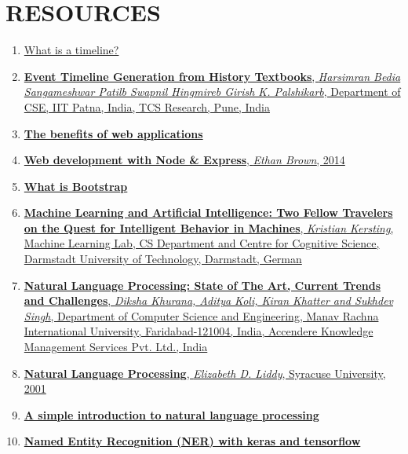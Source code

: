 \documentclass{report}
\begin{document}
\section* {RESOURCES}
\begin{enumerate}
\item \href{http://literacy.kent.edu/eureka/strategies/WhatisaTimeline.pdf}{What is a timeline?}
\item \href{https://aclweb.org/anthology/W17-5912}{\textbf{Event Timeline Generation from History Textbooks}, \textit{Harsimran Bedia Sangameshwar Patilb Swapnil Hingmireb Girish K. Palshikarb}, Department of CSE, IIT Patna, India, TCS Research, Pune, India}
\item \href{https://www.magicwebsolutions.co.uk/blog/the-benefits-of-web-based-applications.htm}{\textbf{The benefits of web applications}}
\item \href{http://www.vanmeegern.de/fileadmin/user_upload/PDF/Web_Development_with_Node_Express.pdf}{\textbf{Web development with Node \& Express}, \textit{Ethan Brown}, 2014}
\item \href{https://www.taniarascia.com/what-is-bootstrap-and-how-do-i-use-it/}{\textbf{What is Bootstrap}}
\item \href{https://ml-research.github.io/papers/kersting2018aiml_frontiers.pdf}{\textbf{Machine Learning and Artificial Intelligence: Two Fellow Travelers on the Quest for Intelligent Behavior in Machines}, \textit{Kristian Kersting}, Machine Learning Lab, CS Department and Centre for Cognitive Science, Darmstadt University of Technology, Darmstadt, German}
\item \href{https://arxiv.org/ftp/arxiv/papers/1708/1708.05148.pdf}{\textbf{Natural Language Processing: State of The Art, Current Trends and Challenges}, \textit{Diksha Khurana, Aditya Koli, Kiran Khatter and Sukhdev Singh}, Department of Computer Science and Engineering, Manav Rachna International University, Faridabad-121004, India, Accendere Knowledge Management Services Pvt. Ltd., India}
\item \href{https://surface.syr.edu/cgi/viewcontent.cgi?article=1043&context=istpub} {\textbf{Natural Language Processing}, \textit{Elizabeth D. Liddy}, Syracuse University, 2001}
\item \href{https://becominghuman.ai/a-simple-introduction-to-natural-language-processing-ea66a1747b32}{\textbf{A simple introduction to natural language processing}}
\item \href{https://towardsdatascience.com/named-entity-recognition-ner-meeting-industrys-requirement-by-applying-state-of-the-art-deep-698d2b3b4ede}{\textbf{Named Entity Recognition (NER) with keras and tensorflow}}

\end{enumerate}
\end{document}
